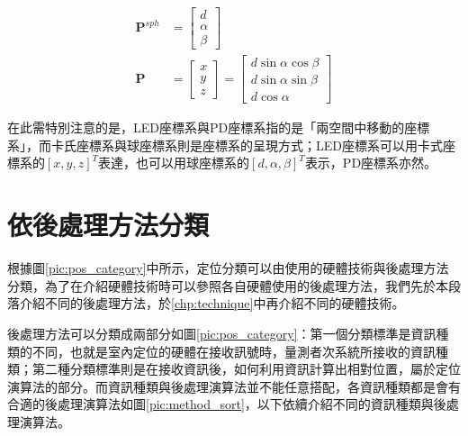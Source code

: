    \begin{equation}
    \label{eqn:car2sph}
        \begin{aligned}
        \boldsymbol{P}^{sph}&=\left[\begin{array}{c}
            d\\\alpha\\\beta
            \end{array}\right] \\  
        \boldsymbol{P} &= \left[\begin{array}{c}
            x\\y\\z
            \end{array}\right]=
            \left[\begin{array}{c}
            d\sin\alpha\cos\beta \\
            d\sin\alpha\sin\beta\\
            d\cos\alpha
            \end{array}\right] 
    \end{aligned}
   \end{equation}

   在此需特別注意的是，LED座標系與PD座標系指的是「兩空間中移動的座標系」，而卡氏座標系與球座標系則是座標系的呈現方式；LED座標系可以用卡式座標系的$[x,y,z]^T$表達，也可以用球座標系的$[d,\alpha,\beta]^T$表示，PD座標系亦然。



\section{依後處理方法分類}
\label{chp:method}

    
    根據圖\ref{pic:pos_category}中所示，定位分類可以由使用的硬體技術與後處理方法分類，為了在介紹硬體技術時可以參照各自硬體使用的後處理方法，我們先於本段落介紹不同的後處理方法，於\ref{chp:technique}中再介紹不同的硬體技術。

    後處理方法可以分類成兩部分如圖\ref{pic:pos_category}：第一個分類標準是資訊種類的不同，也就是室內定位的硬體在接收訊號時，量測者次系統所接收的資訊種類；第二種分類標準則是在接收資訊後，如何利用資訊計算出相對位置，屬於定位演算法的部分。而資訊種類與後處理演算法並不能任意搭配，各資訊種類都是會有合適的後處理演算法如圖\ref{pic:method_sort}，以下依續介紹不同的資訊種類與後處理演算法。

